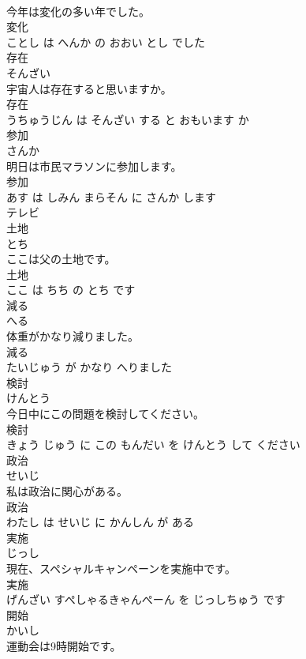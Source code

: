 \documentclass[8pt]{extreport}
\begin{document}
\begin{CJK}{UTF8}{min}
\\	今年は変化の多い年でした。	
\\	変化 
\\	ことし は へんか の おおい とし でした			
\\	存在	
\\	そんざい			
\\	宇宙人は存在すると思いますか。	
\\	存在 
\\	うちゅうじん は そんざい する と おもいます か			
\\	参加	
\\	さんか			
\\	明日は市民マラソンに参加します。	
\\	参加 
\\	あす は しみん まらそん に さんか します			
\\	テレビ	
\\	土地	
\\	とち			
\\	ここは父の土地です。	
\\	土地 
\\	ここ は ちち の とち です			
\\	減る	
\\	へる			
\\	体重がかなり減りました。	
\\	減る 
\\	たいじゅう が かなり へりました			
\\	検討	
\\	けんとう			
\\	今日中にこの問題を検討してください。	
\\	検討 
\\	きょう じゅう に この もんだい を けんとう して ください			
\\	政治	
\\	せいじ			
\\	私は政治に関心がある。	
\\	政治 
\\	わたし は せいじ に かんしん が ある			
\\	実施	
\\	じっし			
\\	現在、スペシャルキャンペーンを実施中です。	
\\	実施 
\\	げんざい すぺしゃるきゃんぺーん を じっしちゅう です			
\\	開始	
\\	かいし			
\\	運動会は9時開始です。	

\end{CJK}
\end{document}
